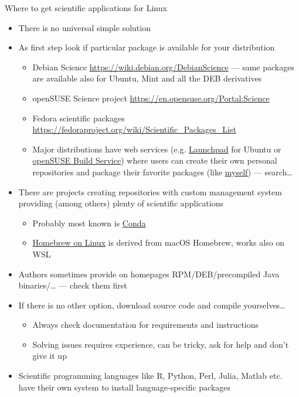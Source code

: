 \documentclass[compress, xelatex, 11pt, xcolor=svgnames, aspectratio=169,
	hyperref={
		bookmarks=true,
		unicode=true,
		colorlinks=true,
		pdftitle={Linux, command line and MetaCentrum},
		plainpages=false,
		pdfauthor={Vojtech Zeisek},
		pdfsubject={Course about use of Linux command line, writing shell scripts and using MetaCentrum of CESNET},
		pdfcreator={XeLaTeX},
		pdfkeywords={Linux, GNU, BASH, shell, command line, MetaCentrum},
		linkcolor=DarkRed, %
		anchorcolor=DarkBlue, %
		citecolor=Indigo, %
		filecolor=NavyBlue, %
		menucolor=DarkMagenta, %
		urlcolor=DarkBlue, %
		},
	url={hyphens, lowtilde} %
	]{beamer}
\begin{document}
\begin{frame}[allowframebreaks]{Where to get scientific applications for Linux}
	\begin{itemize}
		\item There is no universal simple solution
		\item As first step look if particular package is available for your distribution
		\begin{itemize}
			\item Debian Science \url{https://wiki.debian.org/DebianScience} --- same packages are available also for Ubuntu, Mint and all the DEB derivatives
			\item openSUSE Science project \url{https://en.opensuse.org/Portal:Science}
			\item Fedora scientific packages \url{https://fedoraproject.org/wiki/Scientific_Packages_List}
			\item Major distributions have web services (e.g. \href{https://launchpad.net/}{Launchpad} for Ubuntu or \href{https://build.opensuse.org/}{openSUSE Build Service}) where users can create their own personal repositories and package their favorite packages (like \href{https://build.opensuse.org/project/show/home:vojtaeus}{myself}) --- search\ldots
		\end{itemize}
		\item There are projects creating repositories with custom management system providing (among others) plenty of scientific applications
		\begin{itemize}
			\item Probably most known is \href{https://docs.conda.io/}{Conda}
			\item \href{https://docs.brew.sh/Homebrew-on-Linux}{Homebrew on Linux} is derived from macOS Homebrew, works also on WSL
		\end{itemize}
		\item Authors sometimes provide on homepages RPM/DEB/precompiled Java binaries/\ldots{ }--- check them first
		\item If there is no other option, download source code and compile yourselves\ldots
		\begin{itemize}
			\item Always check documentation for requirements and instructions
			\item Solving issues requires experience, can be tricky, ask for help and don't give it up
		\end{itemize}
		\item Scientific programming languages like R, Python, Perl, Julia, Matlab etc. have their own system to install language-specific packages

\end{itemize}
\end{frame}
\end{document}
